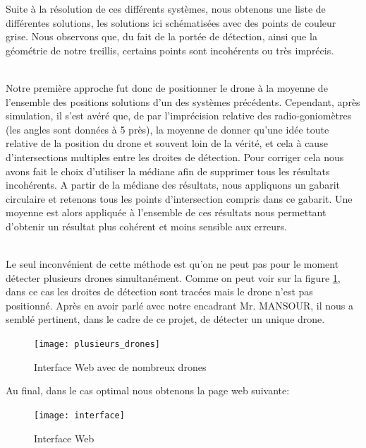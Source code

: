   Suite à la résolution de ces différents systèmes, nous
obtenons une liste de différentes solutions, les solutions ici
schématisées avec des points de couleur grise. Nous observons
que, du fait de la portée de détection, ainsi que la géométrie
de notre treillis, certains points sont incohérents ou très
imprécis.

~\\
Notre première approche fut donc de positionner le drone à
la moyenne de l’ensemble des positions solutions d’un des
systèmes précédents. Cependant, après simulation, il s’est
avéré que, de par l’imprécision relative des
radio-goniomètres (les angles sont données à 5 près), la moyenne de donner qu’une idée toute relative de la position du drone et souvent loin de la vérité, et
cela à cause d’intersections multiples entre les droites de détection.
Pour corriger cela nous avons fait le choix d’utiliser la médiane afin de supprimer tous les résultats
incohérents. A partir de la médiane des résultats, nous appliquons un gabarit circulaire et retenons
tous les points d’intersection compris dans ce gabarit. Une moyenne est alors appliquée à l’ensemble
de ces résultats nous permettant d’obtenir un résultat plus cohérent et moins sensible aux erreurs.


~\\

Le seul inconvénient de cette méthode est qu'on ne peut pas pour le moment détecter plusieurs drones simultanément. Comme on peut voir sur la figure \ref{fig:plusieursdrones}, dans ce cas les droites de détection sont tracées mais le drone n'est pas positionné. Après en avoir parlé avec notre encadrant Mr. MANSOUR, il nous a semblé pertinent, dans le cadre de ce projet, de détecter un unique drone.

\begin{figure}[h]
  \centering
  \texttt{[image: plusieurs\_drones]}
  \caption{Interface Web avec de nombreux drones}
  \label{fig:plusieursdrones}
\end{figure}

\newpage
Au final, dans le cas optimal nous obtenons la page web suivante:

\begin{figure}[!h]
  \centering
  \texttt{[image: interface]}
  \caption{Interface Web}
  \label{fig:interface}
\end{figure}





